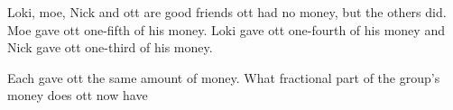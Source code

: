 Loki, moe, Nick and ott are good friends ott had no money, but the others did. Moe gave ott one-fifth of his money. Loki gave ott one-fourth of his money and Nick gave ott one-third of his money.

Each gave ott the same amount of money. What fractional part of the group's money does ott now have
